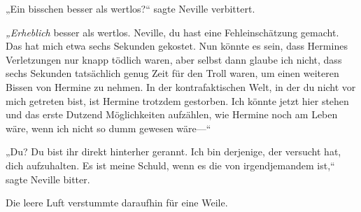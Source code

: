 „Ein bisschen besser als wertlos?“ sagte Neville verbittert.

\emph{„Erheblich} besser als wertlos. Neville, du hast eine Fehleinschätzung gemacht. Das hat mich etwa sechs Sekunden gekostet. Nun könnte es sein, dass Hermines Verletzungen nur knapp tödlich waren, aber selbst dann glaube ich nicht, dass sechs Sekunden tatsächlich genug Zeit für den Troll waren, um einen weiteren Bissen von Hermine zu nehmen. In der kontrafaktischen Welt, in der du nicht vor mich getreten bist, ist Hermine trotzdem gestorben. Ich könnte jetzt hier stehen und das erste Dutzend Möglichkeiten aufzählen, wie Hermine noch am Leben wäre, wenn ich nicht so dumm gewesen wäre—“

„Du? Du bist ihr direkt hinterher gerannt. Ich bin derjenige, der versucht hat, dich aufzuhalten. Es ist meine Schuld, wenn es die von irgendjemandem ist,“ sagte Neville bitter.

Die leere Luft verstummte daraufhin für eine Weile.


